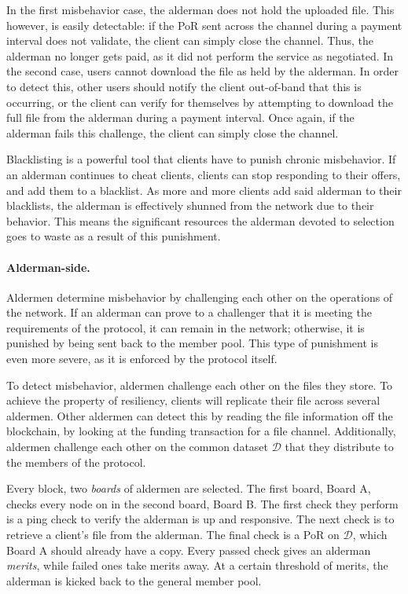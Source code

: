 \documentclass{article}
\begin{document}
In the first misbehavior case, the alderman does not hold the uploaded file.
This however, is easily detectable: if the PoR sent across the channel during a
payment interval does not validate, the client can simply close the channel.
Thus, the alderman no longer gets paid, as it did not perform the service as
negotiated. In the second case, users cannot download the file as held by the
alderman. In order to detect this, other users should notify the client
out-of-band that this is occurring, or the client can verify for themselves by
attempting to download the full file from the alderman during a payment
interval. Once again, if the alderman fails this challenge, the client can
simply close the channel.

Blacklisting is a powerful tool that clients have to punish chronic misbehavior.
If an alderman continues to cheat clients, clients can stop responding to their
offers, and add them to a blacklist. As more and more clients add said alderman
to their blacklists, the alderman is effectively shunned from the network due to
their behavior. This means the significant resources the alderman devoted to
selection goes to waste as a result of this punishment.

\paragraph{Alderman-side.} Aldermen determine misbehavior by challenging each
other on the operations of the network. If an alderman can prove to a challenger
that it is meeting the requirements of the protocol, it can remain in the
network; otherwise, it is punished by being sent back to the member pool. This
type of punishment is even more severe, as it is enforced by the protocol
itself.

To detect misbehavior, aldermen challenge each other on the files they store. To
achieve the property of resiliency, clients will replicate their file across
several aldermen. Other aldermen can detect this by reading the file information
off the blockchain, by looking at the funding transaction for a file channel.
Additionally, aldermen challenge each other on the common dataset $\mathcal{D}$
that they distribute to the members of the protocol.

Every block, two \emph{boards} of aldermen are selected. The first board, Board
A, checks every node on in the second board, Board B. The first check they
perform is a ping check to verify the alderman is up and responsive. The next
check is to retrieve a client's file from the alderman. The final check is a
PoR on $\mathcal {D}$, which Board A should already have a copy. Every passed
check gives an alderman \emph{merits}, while failed ones take merits away. At a
certain threshold of merits, the alderman is kicked back to the general member
pool.
\end{document}
